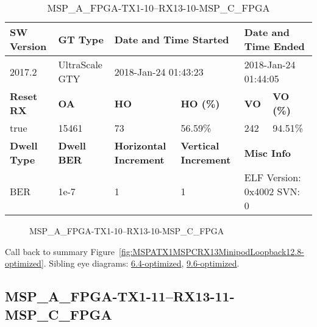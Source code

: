 \begin{table}[h]
\centering
\caption{MSP\_A\_FPGA-TX1-10--RX13-10-MSP\_C\_FPGA}
\label{tab:MSPAFPGATX110RX1310MSPCFPGA12.8-optimized}
\begin{tabular}{@{}|l|l|l|l|l|l|@{}}
\toprule
\textbf{SW Version}                & \textbf{GT Type}   & \multicolumn{2}{l|}{\textbf{Date and Time Started}}            & \multicolumn{2}{l|}{\textbf{Date and Time Ended}}        \\ \midrule
2017.2                       & UltraScale GTY          & \multicolumn{2}{l|}{2018-Jan-24 01:43:23}                   & \multicolumn{2}{l|}{2018-Jan-24 01:44:05}               \\ \midrule
\textbf{Reset RX}                  & \textbf{OA} & \textbf{HO}   & \textbf{HO (\%)} & \textbf{VO} & \textbf{VO (\%)} \\ \midrule
true & 15461        & 73          & 56.59\%        & 242        & 94.51\%       \\ \midrule
\textbf{Dwell Type}                & \textbf{Dwell BER} & \textbf{Horizontal Increment} & \textbf{Vertical Increment}    & \multicolumn{2}{l|}{\textbf{Misc Info}}                  \\ \midrule
BER                            & 1e-7        & 1        & 1           & \multicolumn{2}{l|}{ELF Version: 0x4002 SVN: 0}                         \\ \bottomrule
\end{tabular}
\end{table}

\begin{figure}[h]
\caption{MSP\_A\_FPGA-TX1-10--RX13-10-MSP\_C\_FPGA} \label{fig:MSPAFPGATX110RX1310MSPCFPGA12.8-optimized}
\end{figure}

Call back to summary Figure~\ref{fig:MSPATX1MSPCRX13MinipodLoopback12.8-optimized}.
Sibling eye diagrams: \hyperref[sec:MSPAFPGATX110RX1310MSPCFPGA6.4-optimized]{6.4-optimized}, \hyperref[sec:MSPAFPGATX110RX1310MSPCFPGA9.6-optimized]{9.6-optimized}.

\clearpage
\newpage


\subsection{MSP\_A\_FPGA-TX1-11--RX13-11-MSP\_C\_FPGA}\label{sec:MSPAFPGATX111RX1311MSPCFPGA12.8-optimized}

